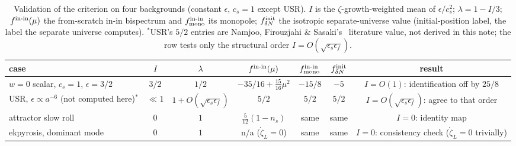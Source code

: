 \documentclass[aps,prd,twocolumn,superscriptaddress,showpacs,preprintnumbers,nofootinbib,longbibliography,floatfix]{revtex4-2}
\newcommand{\eps}{\epsilon}
\begin{document}
\begin{table}[t]
\caption{Validation of the criterion on four backgrounds (constant $\eps$, $c_s=1$
except USR). $I$ is the $\zeta$-growth-weighted mean of $\eps/c_s^2$; $\lambda=1-I/3$;
$f^{\rm in\text{-}in}(\mu)$ the from-scratch in-in bispectrum and $f^{\rm in\text{-}in}_{\rm mono}$
its monopole; $f_{\delta N}^{\rm init}$ the isotropic separate-universe value (initial-position
label, the label the separate universe computes). $^{*}$USR's $5/2$ entries are Namjoo,
Firouzjahi \& Sasaki's~\cite{Namjoo2013} literature value, not derived in this note; the row
tests only the structural order $I=O(\sqrt{\eps_s\eps_f})$.}
\label{tab:validation}
\begin{ruledtabular}
\begin{tabular}{lcccccc}
case & $I$ & $\lambda$ & $f^{\rm in\text{-}in}(\mu)$ & $f^{\rm in\text{-}in}_{\rm mono}$ & $f_{\delta N}^{\rm init}$ & result \\
\hline
$w{=}0$ scalar, $c_s{=}1$, $\eps=3/2$ & $3/2$ & $1/2$ & $-35/16+\tfrac{15}{16}\mu^2$ & $-15/8$ & $-5$ & $I=O(1)$: identification off by $25/8$ \\
USR, $\eps\propto a^{-6}$ (not computed here)$^{*}$ & $\ll1$ & $1+O(\sqrt{\eps_s\eps_f})$ & $5/2$ & $5/2$ & $5/2$ & $I=O(\sqrt{\eps_s\eps_f})$: agree to that order \\
attractor slow roll & $0$ & $1$ & $\tfrac{5}{12}(1-n_s)$ & same & same & $I=0$: identity map \\
ekpyrosis, dominant mode & $0$ & $1$ & n/a ($\dot\zeta_L=0$) & same & same & $I=0$: consistency check ($\dot\zeta_L=0$ trivially) \\
\end{tabular}
\end{ruledtabular}
\end{table}
\end{document}
